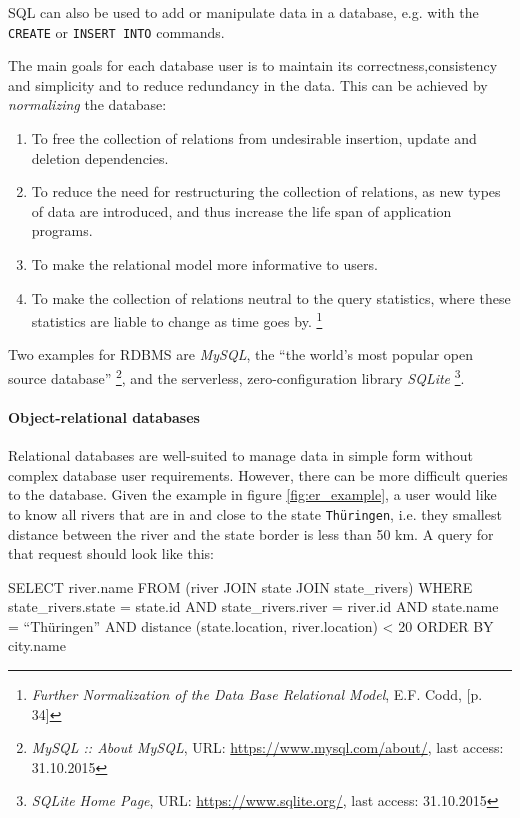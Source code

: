 SQL can also be used to add or manipulate data in a database, e.g. with the \texttt{CREATE} or \texttt{INSERT INTO} commands.

The main goals for each database user is to maintain its correctness,consistency and simplicity and to reduce redundancy in the data. This can be achieved by \emph{normalizing} the database:
\begin{enumerate}
  \item To free the collection of relations from undesirable insertion, update and deletion dependencies.
  \item To reduce the need for restructuring the collection of relations, as new types of data are introduced, and thus increase the life span of application programs.
  \item To make the relational model more informative to users.
  \item To make the collection of relations neutral to the query statistics, where these statistics are liable to change as time goes by.
\footnote{
  \textit{Further Normalization of the Data Base Relational Model},
  E.F. Codd,
  [p. 34]
}
\end{enumerate}

Two examples for RDBMS are \emph{MySQL}, the ``the world's most popular open source database''
\footnote{
  \textit{MySQL :: About MySQL},
  URL: \url{https://www.mysql.com/about/},
  last access: 31.10.2015
}, and the serverless, zero-configuration library \emph{SQLite}
\footnote{
  \textit{SQLite Home Page},
  URL: \url{https://www.sqlite.org/},
  last access: 31.10.2015
}.


\paragraph{Object-relational databases} %
\label{par:object_relational_databases}

Relational databases are well-suited to manage data in simple form without complex database user requirements. However, there can be more difficult queries to the database. Given the example in figure \ref{fig:er_example}, a user would like to know all rivers that are in and close to the state \texttt{Thüringen}, i.e. they smallest distance between the river and the state border is less than 50 km. A query for that request should look like this:
\begin{verbatimtab}
  SELECT    river.name
  FROM      (river JOIN state JOIN state_rivers)
  WHERE     state_rivers.state = state.id AND
            state_rivers.river = river.id AND
            state.name = ``Thüringen'' AND
            distance (state.location, river.location) < 20
  ORDER BY  city.name
\end{verbatimtab}

